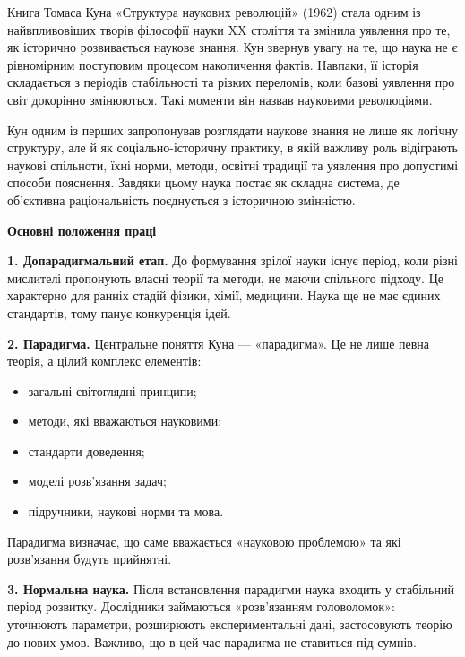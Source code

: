 \documentclass[12pt,a4paper]{article}
\begin{document}
Книга Томаса Куна «Структура наукових революцій» (1962) стала одним із найвпливовіших творів філософії науки XX століття та змінила уявлення про те, як історично розвивається наукове знання. Кун звернув увагу на те, що наука не є рівномірним поступовим процесом накопичення фактів. Навпаки, її історія складається з періодів стабільності та різких переломів, коли базові уявлення про світ докорінно змінюються. Такі моменти він назвав науковими революціями.

Кун одним із перших запропонував розглядати наукове знання не лише як логічну структуру, але й як соціально-історичну практику, в якій важливу роль відіграють наукові спільноти, їхні норми, методи, освітні традиції та уявлення про допустимі способи пояснення. Завдяки цьому наука постає як складна система, де об’єктивна раціональність поєднується з історичною змінністю.

\vspace{1em}

\begin{center}\textbf{\large Основні положення праці}\end{center}

\textbf{1. Допарадигмальний етап.}  
До формування зрілої науки існує період, коли різні мислителі пропонують власні теорії та методи, не маючи спільного підходу. Це характерно для ранніх стадій фізики, хімії, медицини. Наука ще не має єдиних стандартів, тому панує конкуренція ідей.

\textbf{2. Парадигма.}  
Центральне поняття Куна — «парадигма». Це не лише певна теорія, а цілий комплекс елементів:
\begin{itemize}
    \item загальні світоглядні принципи;
    \item методи, які вважаються науковими;
    \item стандарти доведення;
    \item моделі розв’язання задач;
    \item підручники, наукові норми та мова.
\end{itemize}
Парадигма визначає, що саме вважається «науковою проблемою» та які розв’язання будуть прийнятні.

\textbf{3. Нормальна наука.}  
Після встановлення парадигми наука входить у стабільний період розвитку. Дослідники займаються «розв’язанням головоломок»: уточнюють параметри, розширюють експериментальні дані, застосовують теорію до нових умов. Важливо, що в цей час парадигма не ставиться під сумнів.
\end{document}
